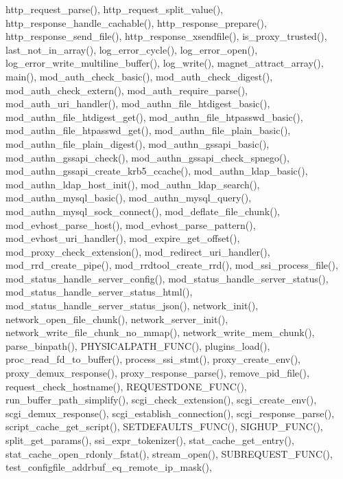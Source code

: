 http\-\_\-request\-\_\-parse(), http\-\_\-request\-\_\-split\-\_\-value(), http\-\_\-response\-\_\-handle\-\_\-cachable(), http\-\_\-response\-\_\-prepare(), http\-\_\-response\-\_\-send\-\_\-file(), http\-\_\-response\-\_\-xsendfile(), is\-\_\-proxy\-\_\-trusted(), last\-\_\-not\-\_\-in\-\_\-array(), log\-\_\-error\-\_\-cycle(), log\-\_\-error\-\_\-open(), log\-\_\-error\-\_\-write\-\_\-multiline\-\_\-buffer(), log\-\_\-write(), magnet\-\_\-attract\-\_\-array(), main(), mod\-\_\-auth\-\_\-check\-\_\-basic(), mod\-\_\-auth\-\_\-check\-\_\-digest(), mod\-\_\-auth\-\_\-check\-\_\-extern(), mod\-\_\-auth\-\_\-require\-\_\-parse(), mod\-\_\-auth\-\_\-uri\-\_\-handler(), mod\-\_\-authn\-\_\-file\-\_\-htdigest\-\_\-basic(), mod\-\_\-authn\-\_\-file\-\_\-htdigest\-\_\-get(), mod\-\_\-authn\-\_\-file\-\_\-htpasswd\-\_\-basic(), mod\-\_\-authn\-\_\-file\-\_\-htpasswd\-\_\-get(), mod\-\_\-authn\-\_\-file\-\_\-plain\-\_\-basic(), mod\-\_\-authn\-\_\-file\-\_\-plain\-\_\-digest(), mod\-\_\-authn\-\_\-gssapi\-\_\-basic(), mod\-\_\-authn\-\_\-gssapi\-\_\-check(), mod\-\_\-authn\-\_\-gssapi\-\_\-check\-\_\-spnego(), mod\-\_\-authn\-\_\-gssapi\-\_\-create\-\_\-krb5\-\_\-ccache(), mod\-\_\-authn\-\_\-ldap\-\_\-basic(), mod\-\_\-authn\-\_\-ldap\-\_\-host\-\_\-init(), mod\-\_\-authn\-\_\-ldap\-\_\-search(), mod\-\_\-authn\-\_\-mysql\-\_\-basic(), mod\-\_\-authn\-\_\-mysql\-\_\-query(), mod\-\_\-authn\-\_\-mysql\-\_\-sock\-\_\-connect(), mod\-\_\-deflate\-\_\-file\-\_\-chunk(), mod\-\_\-evhost\-\_\-parse\-\_\-host(), mod\-\_\-evhost\-\_\-parse\-\_\-pattern(), mod\-\_\-evhost\-\_\-uri\-\_\-handler(), mod\-\_\-expire\-\_\-get\-\_\-offset(), mod\-\_\-proxy\-\_\-check\-\_\-extension(), mod\-\_\-redirect\-\_\-uri\-\_\-handler(), mod\-\_\-rrd\-\_\-create\-\_\-pipe(), mod\-\_\-rrdtool\-\_\-create\-\_\-rrd(), mod\-\_\-ssi\-\_\-process\-\_\-file(), mod\-\_\-status\-\_\-handle\-\_\-server\-\_\-config(), mod\-\_\-status\-\_\-handle\-\_\-server\-\_\-status(), mod\-\_\-status\-\_\-handle\-\_\-server\-\_\-status\-\_\-html(), mod\-\_\-status\-\_\-handle\-\_\-server\-\_\-status\-\_\-json(), network\-\_\-init(), network\-\_\-open\-\_\-file\-\_\-chunk(), network\-\_\-server\-\_\-init(), network\-\_\-write\-\_\-file\-\_\-chunk\-\_\-no\-\_\-mmap(), network\-\_\-write\-\_\-mem\-\_\-chunk(), parse\-\_\-binpath(), P\-H\-Y\-S\-I\-C\-A\-L\-P\-A\-T\-H\-\_\-\-F\-U\-N\-C(), plugins\-\_\-load(), proc\-\_\-read\-\_\-fd\-\_\-to\-\_\-buffer(), process\-\_\-ssi\-\_\-stmt(), proxy\-\_\-create\-\_\-env(), proxy\-\_\-demux\-\_\-response(), proxy\-\_\-response\-\_\-parse(), remove\-\_\-pid\-\_\-file(), request\-\_\-check\-\_\-hostname(), R\-E\-Q\-U\-E\-S\-T\-D\-O\-N\-E\-\_\-\-F\-U\-N\-C(), run\-\_\-buffer\-\_\-path\-\_\-simplify(), scgi\-\_\-check\-\_\-extension(), scgi\-\_\-create\-\_\-env(), scgi\-\_\-demux\-\_\-response(), scgi\-\_\-establish\-\_\-connection(), scgi\-\_\-response\-\_\-parse(), script\-\_\-cache\-\_\-get\-\_\-script(), S\-E\-T\-D\-E\-F\-A\-U\-L\-T\-S\-\_\-\-F\-U\-N\-C(), S\-I\-G\-H\-U\-P\-\_\-\-F\-U\-N\-C(), split\-\_\-get\-\_\-params(), ssi\-\_\-expr\-\_\-tokenizer(), stat\-\_\-cache\-\_\-get\-\_\-entry(), stat\-\_\-cache\-\_\-open\-\_\-rdonly\-\_\-fstat(), stream\-\_\-open(), S\-U\-B\-R\-E\-Q\-U\-E\-S\-T\-\_\-\-F\-U\-N\-C(), test\-\_\-configfile\-\_\-addrbuf\-\_\-eq\-\_\-remote\-\_\-ip\-\_\-mask(), 